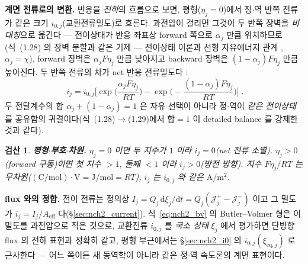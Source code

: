 \documentclass[11pt,a4paper]{article}
\newtheorem*{verifybox}{검산}
\newcommand{\dd}{\mathrm{d}}
\newcommand{\eff}{\mathrm{eff}}
\newcommand{\eq}{\mathrm{eq}}
\begin{document}
\textbf{계면 전류로의 변환.} 반응을 \emph{전하}의 흐름으로 보면, 평형($\eta_j=0$)에서 정$\cdot$역 반쪽 전류가 같은
크기 $i_{0,j}$(교환전류밀도)로 흐른다. 과전압이 걸리면 그것이 두 반쪽 장벽을 \emph{비대칭}으로 옮긴다 — 전이상태가
반응 좌표상 forward 쪽으로 $\alpha_j$ 만큼 위치하므로(식~(1.28) 의 장벽 분할과 같은 기제 — 전이상태 이론과
선형 자유에너지 관계 \cite{eyring1935,evanspolanyi1938}, $\alpha_j=\chi$), forward
장벽은 $\alpha_jF\eta_j$ 만큼 낮아지고 backward 장벽은 $(1-\alpha_j)F\eta_j$ 만큼 높아진다. 두 반쪽 전류의 차가
net 반응 전류밀도다 \cite{bardfaulkner,newman2004}:
\begin{equation}
\boxed{\;i_j=i_{0,j}\Big[\exp\!\Big(\frac{\alpha_jF\eta_j}{RT}\Big)-\exp\!\Big(-\frac{(1-\alpha_j)F\eta_j}{RT}\Big)\Big]\;.}
\label{eq:nch2_bv}
\end{equation}
두 전달계수의 합 $\alpha_j+(1-\alpha_j)=1$ 은 자유 선택이 아니라 정$\cdot$역이 \emph{같은 전이상태}를 공유함의
귀결이다(식~(1.28)$\to$(1.29)에서 합$=1$ 이 detailed balance 를 강제한 것과 같다).
\begin{verifybox}
\textbf{평형$\cdot$부호$\cdot$차원.} $\eta_j=0$ 이면 두 지수가 $1$ 이라 $i_j=0$(net 전류 소멸). $\eta_j>0$(forward
구동)이면 첫 지수 $>1$, 둘째 $<1$ 이라 $i_j>0$(방전 방향). 지수 $F\eta_j/RT$ 는 무차원($\mathrm{(C/mol)\cdot V}
=\mathrm{J/mol}=RT$), $i_j$ 는 $i_{0,j}$ 와 같은 $\mathrm{A/m^2}$.
\end{verifybox}
\textbf{flux 와의 정합.} 전이 전류는 정의상 $I_j=Q_j\,\dd\xi_j/\dd t=Q_j(\mathcal J_j^+-\mathcal J_j^-)$ 이고 그
밀도가 $i_j=I_j/A_\eff$ 다(\S\ref{sec:nch2_current}). 식~\eqref{eq:nch2_bv} 의 Butler--Volmer 형은 이 밀도를
과전압으로 적은 것으로, 교환전류 $i_{0,j}$ 를 \emph{국소 상태} $\xi_j$ 에서 평가하면 단방향 flux 의 전하 표현과
정확히 같고, 평형 부근에서는 \S\ref{sec:nch2_i0} 의 $i_{0,j}(\xi_{\eq,j})$ 로 근사한다 — 어느 쪽이든 새 동역학이
아니라 같은 정$\cdot$역 속도론의 계면 표현이다.

\end{document}
